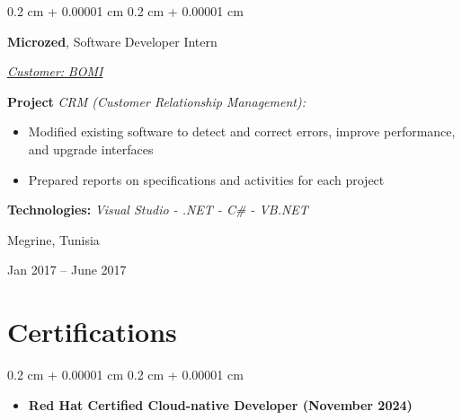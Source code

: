 \documentclass[10pt, a4paper]{article}
\newenvironment{highlights}{
    \begin{itemize}[
        topsep=0.10 cm,
        parsep=0.10 cm,
        partopsep=0pt,
        itemsep=0pt,
        leftmargin=0.4 cm + 10pt
    ]
}{
    \end{itemize}
} %
\newenvironment{highlightsforbulletentries}{
    \begin{itemize}[
        topsep=0.10 cm,
        parsep=0.10 cm,
        partopsep=0pt,
        itemsep=0pt,
        leftmargin=10pt
    ]
}{
    \end{itemize}
} %
\newenvironment{onecolentry}{
    \begin{adjustwidth}{
        0.2 cm + 0.00001 cm
    }{
        0.2 cm + 0.00001 cm
    }
}{
    \end{adjustwidth}
} %
\newenvironment{twocolentry}[2][]{
    \onecolentry
    \def\secondColumn{#2}
    \setcolumnwidth{\fill, 4.5 cm}
    \begin{paracol}{2}
}{
    \switchcolumn \raggedleft \secondColumn
    \end{paracol}
    \endonecolentry
} %
\begin{document}
        \begin{twocolentry}{
            \fontsize{14}{18}Megrine, Tunisia

        Jan 2017 – June 2017
            \normalsize
        }
            \fontsize{12}{16}
            \textcolor{secondaryColor}{\faBriefcase\hspace{4pt}\textbf{Microzed},} Software Developer Intern
            \normalsize

            \vspace{0.10 cm}
                \vspace{0.10 cm}

                \textcolor{tertiaryColor}{\faAngleDoubleRight\hspace{0.1cm}\underline{\textit{Customer:} \textit{BOMI}}}

                \vspace{0.2cm}
                \textbf{Project \faAngleRight} \textit{CRM (Customer Relationship Management):}

                \begin{highlights}
                        \item Modified existing software to detect and correct errors, improve performance, and upgrade interfaces
                        \item Prepared reports on specifications and activities for each project
                \end{highlights}
                \faBuffer
                \textbf{ Technologies:} \textit{Visual Studio - .NET - C\# - VB.NET}

                \vspace{0.10 cm}

        \end{twocolentry}



    
    \section{Certifications}

    \begin{onecolentry}
        \begin{highlightsforbulletentries}


        \item \textbf{Red Hat Certified Cloud-native Developer (November 2024)}


        \end{highlightsforbulletentries}
    \end{onecolentry}
\end{document}
